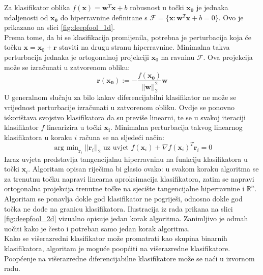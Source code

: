 \documentclass[utf8, diplomski]{fer}
\begin{document}
Za klasifikator oblika $f(\boldsymbol{x}) = \boldsymbol{w}^{T}\boldsymbol{x} + b$ robusnost u točki $\boldsymbol{x_{0}}$ je jednaka udaljenosti od $\boldsymbol{x_{0}}$ do hiperravnine definirane s $\mathscr{F} = \{\boldsymbol{x} : \boldsymbol{w}^{T}\boldsymbol{x}+b=0\}$. Ovo je prikazano na slici \ref{fig:deepfool_1d}. \\
Prema tome, da bi se klasifikacija promijenila, potrebna je perturbacija koja će točku $\boldsymbol{x} = \boldsymbol{x}_{0} + \boldsymbol{r}$ staviti na drugu stranu hiperravnine. Minimalna takva perturbacija jednaka je ortogonalnoj projekciji $\boldsymbol{x}_{0}$ na ravninu $\mathscr{F}$. Ova projekcija može se izračunati u zatvorenom obliku:
\begin{equation}
	\boldsymbol{r}(\boldsymbol{x_{0}}) := - \frac{f(\boldsymbol{x_{0}})}{||\boldsymbol{w}||_{2}^{2}}\boldsymbol{w}
\end{equation}
U generalnom slučaju za bilo kakav diferencijabilni klasifikator ne može se vrijednost perturbacije izračunati u zatvorenom obliku. Ovdje se ponovno iskorištava svojstvo klasifikatora da su previše linearni, te se u svakoj iteraciji klasifikator $f$ linearizira u točki $\boldsymbol{x_{i}}$. Minimalna perturbacija takvog linearnog klasifikatora u koraku $i$ računa se na sljedeći način:
\begin{equation}
	\mathop{\text{arg min}}_{\boldsymbol{r}_{i}}||\boldsymbol{r}_{i}||_{2} \text{ uz uvjet } f(\boldsymbol{x}_{i}) + \nabla f(\boldsymbol{x}_{i})^{T}\boldsymbol{r}_{i} = 0
\end{equation}
Izraz uvjeta predstavlja tangencijalnu hiperravninu na funkciju klasifikatora u točki $\boldsymbol{x}_{i}$. Algoritam opisan riječima bi glasio ovako: u svakom koraku algoritma se za trenutnu točku napravi linearna aproksimacija klasifikatora, zatim se napravi ortogonalna projekcija trenutne točke na sjecište tangencijalne hiperravnine i $\mathbb{R}^{n}$. Algoritam se ponavlja dokle god klasifikator ne pogriješi, odnosno dokle god točka ne dođe na granicu klasifikatora. Ilustracija iz rada prikana na slici \ref{fig:deepfool_2d} vizualno opisuje jedan korak algoritma. Zanimljivo je odmah uočiti kako je često i potreban samo jedan korak algoritma. \\
Kako se višerazredni klasifikator može promatrati kao skupina binarnih klasifikatora, algoritam je moguće poopćiti na višerazredne klasifikatore. Poopćenje na višerazredne diferencijabilne klasifikatore može se naći u izvornom radu\citep{MoosaviDezfooli2016DeepFoolAS}. \\
\end{document}
